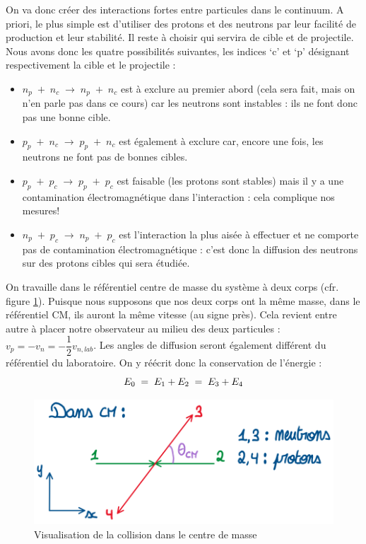 On va donc créer des interactions fortes entre particules dans le continuum. A priori, le plus simple est d'utiliser des protons et des neutrons par leur facilité de production et leur stabilité. Il reste à choisir qui servira de cible et de projectile. Nous avons donc les quatre possibilités suivantes, les indices `c' et `p' désignant respectivement la cible et le projectile :
\begin{itemize}
    \item $n_p\; +\; n_c\; \longrightarrow\; n_p\;+\; n_c$ est à exclure au premier abord (cela sera fait, mais on n'en parle pas dans ce cours) car les neutrons sont instables : ils ne font donc pas une bonne cible.
    \item $p_p\; +\; n_c\; \longrightarrow\; p_p \;+\; n_c$ est également à exclure car, encore une fois, les neutrons ne font pas de bonnes cibles.
    \item $p_p\; +\; p_c\; \longrightarrow\; p_p \;+\; p_c$ est faisable (les protons sont stables) mais il y a une contamination électromagnétique dans l'interaction : cela complique nos mesures!
    \item $n_p\; +\; p_c\; \longrightarrow\; n_p \;+\; p_c$ est l'interaction la plus aisée à effectuer et ne comporte pas de contamination électromagnétique : c'est donc la diffusion des neutrons sur des protons cibles qui sera étudiée.
\end{itemize}
On travaille dans le référentiel centre de masse du système à deux corps (cfr. figure \ref{collision_np_yukawa}). Puisque nous supposons que nos deux corps ont la même masse, dans le référentiel CM, ils auront la même vitesse (au signe près). Cela revient entre autre à placer notre observateur au milieu des deux particules : $v_p = -v_n = -\dfrac{1}{2}v_{n,lab}$. Les angles de diffusion seront également différent du référentiel du laboratoire. On y réécrit donc la conservation de l'énergie :
\[
    E_0 \; = \; E_1 + E_2 \; = \; E_3 + E_4
\]
\begin{figure}[H]
    \centering
    \includegraphics[scale = 0.6]{Images4/collision_CM.png}
    \caption{Visualisation de la collision dans le centre de masse}
    \label{collision_np_yukawa}
\end{figure}

